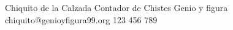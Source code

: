 %
%
%
%


\begin{referees}
		{Chiquito de la Calzada}
		{Contador de Chistes}
		{Genio y figura}
		{chiquito@genioyfigura99.org}
		{123 456 789}
\end{referees}


